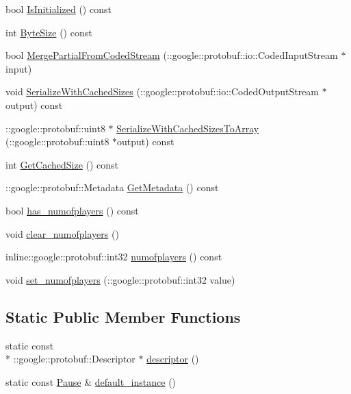 \begin{DoxyCompactItemize}
\item 
bool \hyperlink{class_pause_a5ac3603904cbb13f443e4a79386f3247}{Is\-Initialized} () const 
\item 
int \hyperlink{class_pause_a4ad86c01ac23daac3e82658eca137666}{Byte\-Size} () const 
\item 
bool \hyperlink{class_pause_abc751f0e64bdb9043bf3a1b56c5c89f4}{Merge\-Partial\-From\-Coded\-Stream} (\-::google\-::protobuf\-::io\-::\-Coded\-Input\-Stream $\ast$input)
\item 
void \hyperlink{class_pause_a2fb568f1850b6cdd8eaa699cab95b56e}{Serialize\-With\-Cached\-Sizes} (\-::google\-::protobuf\-::io\-::\-Coded\-Output\-Stream $\ast$output) const 
\item 
\-::google\-::protobuf\-::uint8 $\ast$ \hyperlink{class_pause_a3b78bd2c68b91fff5589432206b5b7d1}{Serialize\-With\-Cached\-Sizes\-To\-Array} (\-::google\-::protobuf\-::uint8 $\ast$output) const 
\item 
int \hyperlink{class_pause_a2af36b0dec18ac3b93b02208cf2c66d3}{Get\-Cached\-Size} () const 
\item 
\-::google\-::protobuf\-::\-Metadata \hyperlink{class_pause_af38c3c10a11ca18dd476c8b076a03c80}{Get\-Metadata} () const 
\item 
bool \hyperlink{class_pause_afcdd5b8246226aafa60f6f639718271c}{has\-\_\-numofplayers} () const 
\item 
void \hyperlink{class_pause_a1a4311ac60f3ffcf15e10ad064df6a0f}{clear\-\_\-numofplayers} ()
\item 
inline\-::google\-::protobuf\-::int32 \hyperlink{class_pause_a282ee0b2f04d64d41b1056bd5d64eea9}{numofplayers} () const 
\item 
void \hyperlink{class_pause_ade24c4a530fb2eb508bf2f24b7a7e47f}{set\-\_\-numofplayers} (\-::google\-::protobuf\-::int32 value)
\end{DoxyCompactItemize}
\subsection*{Static Public Member Functions}
\begin{DoxyCompactItemize}
\item 
static const \\*
\-::google\-::protobuf\-::\-Descriptor $\ast$ \hyperlink{class_pause_a25b48247864d5ce493fdf1363115076e}{descriptor} ()
\item 
static const \hyperlink{class_pause}{Pause} \& \hyperlink{class_pause_a67c55d1187b0e4b77c9b74c0b8a6b5d7}{default\-\_\-instance} ()
\end{DoxyCompactItemize}
